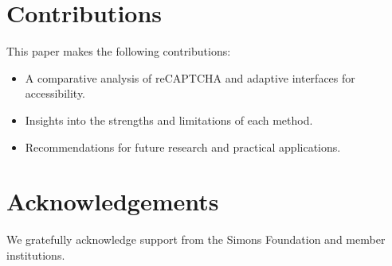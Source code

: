 \documentclass{article}
\begin{document}
\section{Contributions}
This paper makes the following contributions:
\begin{itemize}
    \item A comparative analysis of reCAPTCHA and adaptive interfaces for accessibility.
    \item Insights into the strengths and limitations of each method.
    \item Recommendations for future research and practical applications.
\end{itemize}

\section*{Acknowledgements}
We gratefully acknowledge support from the Simons Foundation and member institutions.

\printbibliography
\end{document}
